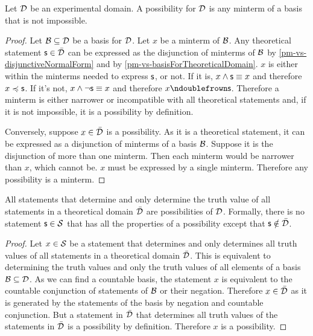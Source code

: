 	\begin{mathSection}
		
		\begin{prop}\label{pm-vs-possibilitiesAreMinterms}
			Let $\mathcal{D}$ be an experimental domain. A possibility for $\mathcal{D}$ is any minterm of a basis that is not impossible.
		\end{prop}
		
		\begin{proof}
			Let $\mathcal{B} \subseteq \mathcal{D}$ be a basis for $\mathcal{D}$. Let $x$ be a minterm of $\mathcal{B}$. Any theoretical statement $\mathsf{s} \in \bar{\mathcal{D}}$ can be expressed as the disjunction of minterms of $\mathcal{B}$ by \ref{pm-vs-disjunctiveNormalForm} and by \ref{pm-vs-basisForTheoreticalDomain}. $x$ is either within the minterms needed to express $\mathsf{s}$, or not. If it is, $x \wedge \mathsf{s} \equiv x$ and therefore $x \preccurlyeq \mathsf{s}$. If it's not, $x \wedge \neg \mathsf{s} \equiv x$ and therefore $x \ncomp \stmt$. Therefore a minterm is either narrower or incompatible with all theoretical statements and, if it is not impossible, it is a possibility by definition.
			
			Conversely, suppose $x \in \bar{\mathcal{D}}$ is a possibility. As it is a theoretical statement, it can be expressed as a disjunction of minterms of a basis $\mathcal{B}$. Suppose it is the disjunction of more than one minterm. Then each minterm would be narrower than $x$, which cannot be. $x$ must be expressed by a single minterm. Therefore any possibility is a minterm.
		\end{proof}
		
		\begin{prop}
			All statements that determine and only determine the truth value of all statements in a theoretical domain $\bar{\mathcal{D}}$ are possibilities of $\mathcal{D}$. Formally, there is no statement $\mathsf{s} \in \mathcal{S}$ that has all the properties of a possibility except that $\mathsf{s} \notin \bar{\mathcal{D}}$.
		\end{prop}
		
		\begin{proof}
			Let $x \in \mathcal{S}$ be a statement that determines and only determines all truth values of all statements in a theoretical domain $\bar{\mathcal{D}}$. This is equivalent to determining the truth values and only the truth values of all elements of a basis $\mathcal{B} \subseteq \mathcal{D}$. As we can find a countable basis, the statement $x$ is equivalent to the countable conjunction of statements of $\mathcal{B}$ or their negation. Therefore $x \in \bar{\mathcal{D}}$ as it is generated by the statements of the basis by negation and countable conjunction. But a statement in $\bar{\mathcal{D}}$ that determines all truth values of the statements in $\bar{\mathcal{D}}$ is a possibility by definition. Therefore $x$ is a possibility.
		\end{proof}	
		
		
	\end{mathSection}
	
